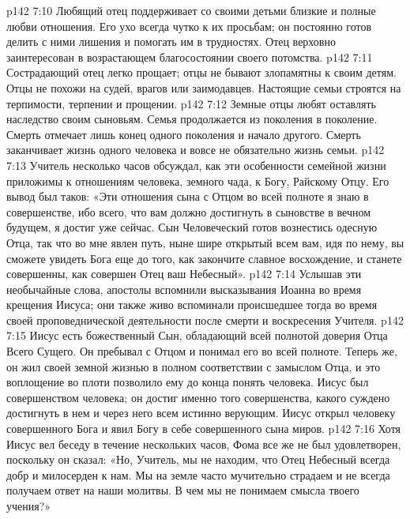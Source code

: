 \vs p142 7:10 \bibnobreakspace {} Любящий отец поддерживает со своими детьми близкие и полные любви отношения. Его ухо всегда чутко к их просьбам; он постоянно готов делить с ними лишения и помогать им в трудностях. Отец верховно заинтересован в возрастающем благосостоянии своего потомства.
\vs p142 7:11 \bibnobreakspace {} Сострадающий отец легко прощает; отцы не бывают злопамятны к своим детям. Отцы не похожи на судей, врагов или заимодавцев. Настоящие семьи строятся на терпимости, терпении и прощении.
\vs p142 7:12 \bibnobreakspace {} Земные отцы любят оставлять наследство своим сыновьям. Семья продолжается из поколения в поколение. Смерть отмечает лишь конец одного поколения и начало другого. Смерть заканчивает жизнь одного человека и вовсе не обязательно жизнь семьи.
\vs p142 7:13 \pc Учитель несколько часов обсуждал, как эти особенности семейной жизни приложимы к отношениям человека, земного чада, к Богу, Райскому Отцу. Его вывод был таков: «Эти отношения сына с Отцом во всей полноте я знаю в совершенстве, ибо всего, что вам должно достигнуть в сыновстве в вечном будущем, я достиг уже сейчас. Сын Человеческий готов вознестись одесную Отца, так что во мне явлен путь, ныне шире открытый всем вам, идя по нему, вы сможете увидеть Бога еще до того, как закончите славное восхождение, и станете совершенны, как совершен Отец ваш Небесный».
\vs p142 7:14 Услышав эти необычайные слова, апостолы вспомнили высказывания Иоанна во время крещения Иисуса; они также живо вспоминали происшедшее тогда во время своей проповеднической деятельности после смерти и воскресения Учителя.
\vs p142 7:15 Иисус есть божественный Сын, обладающий всей полнотой доверия Отца Всего Сущего. Он пребывал с Отцом и понимал его во всей полноте. Теперь же, он жил своей земной жизнью в полном соответствии с замыслом Отца, и это воплощение во плоти позволило ему до конца понять человека. Иисус был совершенством человека; он достиг именно того совершенства, какого суждено достигнуть в нем и через него всем истинно верующим. Иисус открыл человеку совершенного Бога и явил Богу в себе совершенного сына миров.
\vs p142 7:16 Хотя Иисус вел беседу в течение нескольких часов, Фома все же не был удовлетворен, поскольку он сказал: «Но, Учитель, мы не находим, что Отец Небесный всегда добр и милосерден к нам. Мы на земле часто мучительно страдаем и не всегда получаем ответ на наши молитвы. В чем мы не понимаем смысла твоего учения?»
